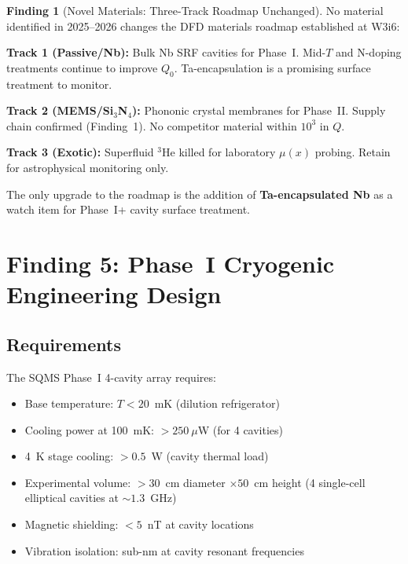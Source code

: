 \documentclass[11pt]{article}
\theoremstyle{definition}
\newtheorem{finding}[theorem]{Finding}
\theoremstyle{remark}
\begin{document}
\begin{finding}[Novel Materials: Three-Track Roadmap Unchanged]
\label{find:novel_unchanged}
No material identified in 2025--2026 changes the DFD materials
roadmap established at W3i6:

\textbf{Track 1 (Passive/Nb):} Bulk Nb SRF cavities for Phase~I.
Mid-$T$ and N-doping treatments continue to improve $Q_0$.
Ta-encapsulation is a promising surface treatment to monitor.

\textbf{Track 2 (MEMS/Si$_3$N$_4$):} Phononic crystal membranes for
Phase~II. Supply chain confirmed (Finding~1). No competitor material
within $10^3$ in $Q$.

\textbf{Track 3 (Exotic):} Superfluid $^3$He killed for laboratory
$\mu(x)$ probing. Retain for astrophysical monitoring only.

The only upgrade to the roadmap is the addition of
\textbf{Ta-encapsulated Nb} as a watch item for Phase~I+ cavity
surface treatment.
\end{finding}


\section{Finding 5: Phase~I Cryogenic Engineering Design}
\label{sec:cryo_design}

\subsection{Requirements}

The SQMS Phase~I 4-cavity array requires:
\begin{itemize}[nosep]
\item Base temperature: $T < 20$~mK (dilution refrigerator)
\item Cooling power at 100~mK: $> 250~\mu$W (for 4 cavities)
\item 4~K stage cooling: $> 0.5$~W (cavity thermal load)
\item Experimental volume: $> 30$~cm diameter $\times 50$~cm height
  (4 single-cell elliptical cavities at $\sim 1.3$~GHz)
\item Magnetic shielding: $< 5$~nT at cavity locations
\item Vibration isolation: sub-nm at cavity resonant frequencies
\end{itemize}
\end{document}

